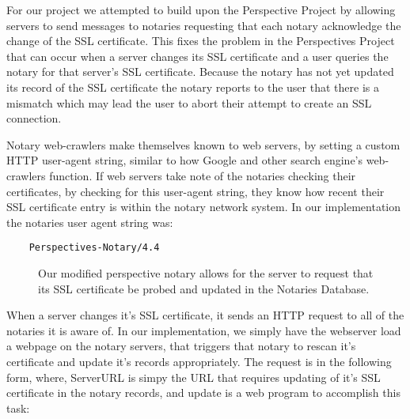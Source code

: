 \documentclass[preprint,review,12pt]{elsarticle}
\begin{document}
For our project we attempted to build upon the Perspective Project by allowing
servers to send messages to notaries requesting that each notary acknowledge
the change of the SSL certificate. This fixes the problem in the Perspectives
Project that can occur when a server changes its SSL certificate and a user
queries the notary for that server's SSL certificate. Because the notary has
not yet updated its record of the SSL certificate the notary reports to the
user that there is a mismatch which may lead the user to abort their attempt to
create an SSL connection.

Notary web-crawlers make themselves known to web servers, by setting a custom
HTTP user-agent string, similar to how Google and other search engine's
web-crawlers function. If web servers take note of the notaries checking their
certificates, by checking for this user-agent string, they know how recent
their SSL certificate entry is within the notary network system. In our
implementation the notaries user agent string was:

\begin{verbatim}
    Perspectives-Notary/4.4
\end{verbatim}

\begin{figure}[h]
\caption{Our modified perspective notary allows for the server to request that
    its SSL certificate be probed and updated in the Notaries Database.}
\end{figure}

When a server changes it's SSL certificate, it sends an HTTP request to all of
the notaries it is aware of. In our implementation, we simply have the webserver
load a webpage on the notary servers, that triggers that notary to rescan it's 
certificate and update it's records appropriately. The request is in the following 
form, where, ServerURL is simpy the URL that requires updating of it's SSL 
certificate in the notary records, and update is a web program
to accomplish this task:
\end{document}

